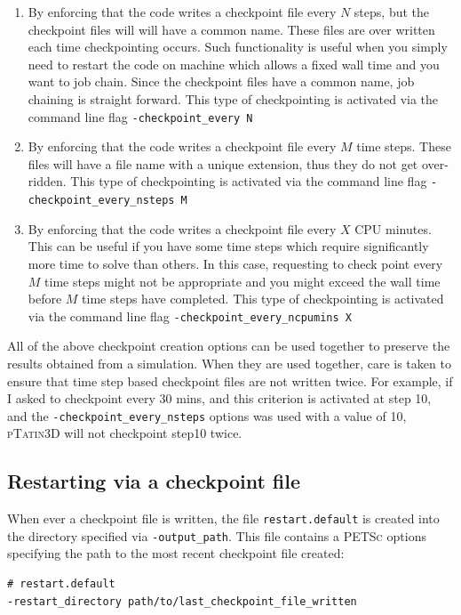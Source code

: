 \documentclass[paper=a4, fontsize=10pt,twoside]{scrartcl}
\newcommand{\ptat}{{{\textsc{pTatin3D}}}}
\newcommand{\PETSc}{{{\textsc{PETSc}}}}
\begin{document}
\begin{enumerate}
\item By enforcing that the code writes a checkpoint file every $N$ steps, but the checkpoint files will will have a common name.
These files are over written each time checkpointing occurs.
Such functionality is useful when you simply need to restart the code on machine which allows a fixed wall time and you want to job chain.
Since the checkpoint files have a common name, job chaining is straight forward.
This type of checkpointing is activated via the command line flag \newline
{\tt -checkpoint\_every N}

\item By enforcing that the code writes a checkpoint file every $M$ time steps.
These files will have a file name with a unique extension, thus they do not get over-ridden.
This type of checkpointing is activated via the command line flag \newline
{\tt -checkpoint\_every\_nsteps M}

\item By enforcing that the code writes a checkpoint file every $X$ CPU minutes.
This can be useful if you have some time steps which require significantly more time to solve than others.
In this case, requesting to check point every $M$ time steps might not be appropriate and you might exceed the wall time before $M$ time steps have completed.
This type of checkpointing is activated via the command line flag\newline
{\tt -checkpoint\_every\_ncpumins X}
\end{enumerate}

All of the above checkpoint creation options can be used together to preserve the results obtained from a simulation.
When they are used together, care is taken to ensure that time step based checkpoint files are not written twice.
For example, if I asked to checkpoint every 30 mins, and this criterion is activated at step 10, and the {\tt -checkpoint\_every\_nsteps} options was used with a value of 10, {\ptat} will not checkpoint step10 twice.

\subsection{Restarting via a checkpoint file}

When ever a checkpoint file is written, the file {\tt restart.default} is created into the directory specified via {\tt -output\_path}.
This file contains a {\PETSc} options specifying the path to the most recent checkpoint file created:
\begin{lstlisting}
# restart.default
-restart_directory path/to/last_checkpoint_file_written
\end{lstlisting}
\end{document}

